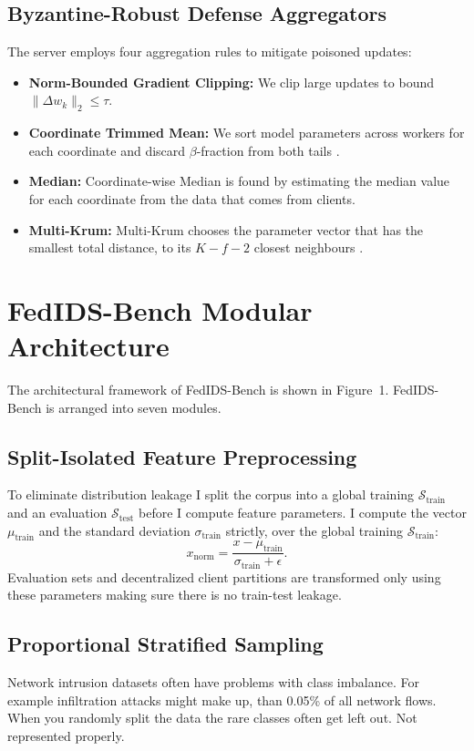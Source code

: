 \documentclass[conference]{IEEEtran}
\begin{document}
\subsection{Byzantine-Robust Defense Aggregators}
The server employs four aggregation rules to mitigate poisoned updates:
\begin{itemize}
    \item \textbf{Norm-Bounded Gradient Clipping:} We clip large updates to bound $\|\Delta w_k\|_2 \leq \tau$.
    \item \textbf{Coordinate Trimmed Mean:} We sort model parameters across workers for each coordinate and discard $\beta$-fraction from both tails \cite{yin2018byzantine}.
    \item \textbf{Median:} Coordinate-wise Median is found by estimating the median value for each coordinate from the data that comes from clients.
    \item \textbf{Multi-Krum:} Multi-Krum chooses the parameter vector that has the smallest total distance, to its $K - f - 2$ closest neighbours \cite{blanchard2017machine}.
\end{itemize}

\section{FedIDS-Bench Modular Architecture}
\label{sec:architecture}

The architectural framework of FedIDS-Bench is shown in Figure~1. FedIDS-Bench is arranged into seven modules.

\subsection{Split-Isolated Feature Preprocessing}
To eliminate distribution leakage I split the corpus into a global training $\mathcal{S}_{\text{train}}$ and an evaluation $\mathcal{S}_{\text{test}}$ before I compute feature parameters. I compute the vector $\mu_{\text{train}}$ and the standard deviation $\sigma_{\text{train}}$ strictly, over the global training $\mathcal{S}_{\text{train}}$:
\begin{equation}
x_{\text{norm}} = \frac{x - \mu_{\text{train}}}{\sigma_{\text{train}} + \epsilon}.
\end{equation}
Evaluation sets and decentralized client partitions are transformed only using these parameters making sure there is no train-test leakage.

\subsection{Proportional Stratified Sampling}
Network intrusion datasets often have problems with class imbalance. For example infiltration attacks might make up, than 0.05\% of all network flows. When you randomly split the data the rare classes often get left out. Not represented properly.
\end{document}

